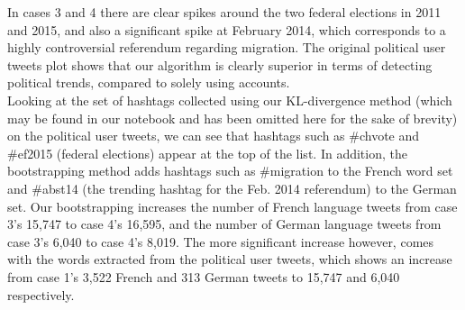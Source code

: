 In cases 3 and 4 there are clear spikes around the two federal elections in 2011 and 2015, and also a significant spike at February 2014, which corresponds to a highly controversial referendum regarding migration. The original political user tweets plot shows that our algorithm is clearly superior in terms of detecting political trends, compared to solely using accounts. \\
Looking at the set of hashtags collected using our KL-divergence method (which may be found in our notebook and has been omitted here for the sake of brevity) on the political user tweets, we can see that hashtags such as \#chvote and \#ef2015 (federal elections) appear at the top of the list. In addition, the bootstrapping method adds hashtags such as \#migration to the French word set and \#abst14 (the trending hashtag for the Feb. 2014 referendum) to the German set. Our bootstrapping increases the number of French language tweets from case 3's 15,747 to case 4's 16,595, and the number of German language tweets from case 3's 6,040 to case 4's 8,019. The more significant increase however, comes with the words extracted from the political user tweets, which shows an increase from case 1's 3,522 French and 313 German tweets to 15,747 and 6,040 respectively.